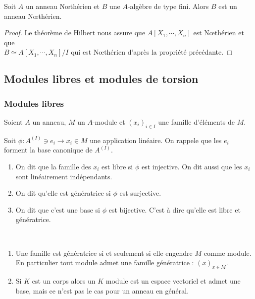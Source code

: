 \begin{prop}

 Soit $A$ un anneau N\oe{}thérien et $B$ une $A$-algèbre de type fini. Alors $B$
est un anneau N\oe{}thérien.
\end{prop}

\begin{proof} Le théorème de Hilbert nous assure que $A[X_1,\cdots,X_n]$ est
N\oe{}thérien et que \\$B\simeq A[X_1,\cdots,X_n]/I$ qui est N\oe{}thérien
d'après la propriété précédante.
\end{proof}

\subsection{Modules libres et modules de torsion}
\subsubsection{Modules libres}
\vspace{0.5em}

\begin{defi}
 
 Soient $A$ un anneau, $M$ un $A$-module et $(x_i)_{i\in I}$ une famille
d'éléments de $M$.

Soit $\phi : A^{(I)}\owns e_i \longrightarrow x_i \in M$ une application
linéaire. On rappele que les $e_i$ forment la base canonique de $A^{(I)}$.

\begin{enumerate}
 \item On dit que la famille des $x_i$ est libre si $\phi$ est injective. On
dit aussi que les $x_i$ sont linéairement indépendants.
\item On dit qu'elle est génératrice si $\phi$ est surjective.
\item On dit que c'est une base si $\phi$ est bijective. C'est à dire qu'elle
est libre et génératrice.
\end{enumerate}
\end{defi}

\begin{example}[Remarque]\ 
\begin{enumerate}
 \item Une famille est génératrice si et seulement si elle engendre $M$ comme
module.\\ En particulier tout module admet une famille génératrice : $(x)_{x\in
M}$.
\item Si $K$ est un corps alors un $K$ module est un espace vectoriel et admet
une base, mais ce n'est pas le cas pour un anneau en général.
\end{enumerate}
\end{example}
\vspace{0.5em}


